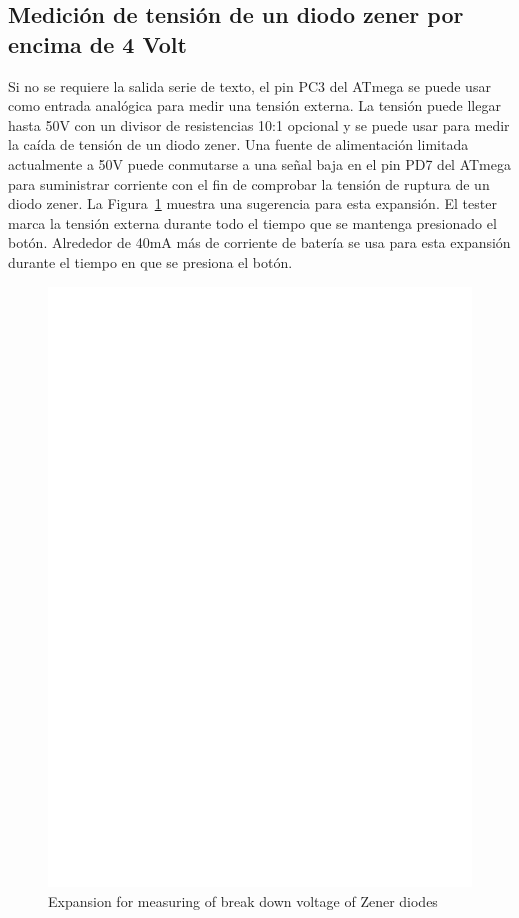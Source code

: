 \subsection{Medición de tensión de un diodo zener por encima de 4 Volt}

Si no se requiere la salida  serie de texto, el pin PC3 del ATmega se puede usar  como entrada analógica para medir una
tensión externa. La tensión puede  llegar hasta 50V con un divisor de resistencias 10:1 opcional  y se puede usar para
medir la caída de tensión de un diodo zener. Una fuente de alimentación limitada actualmente a 50V puede conmutarse a
una señal baja en el pin PD7 del ATmega para suministrar corriente con el fin de comprobar la tensión de ruptura de un
diodo zener. La Figura~\ref{fig:zener} muestra una sugerencia para  esta expansión. El tester marca la tensión externa
durante todo el tiempo que se mantenga presionado el botón. Alrededor de 40mA más de corriente de batería se usa para
esta expansión durante el tiempo en que se presiona el botón.

\begin{figure}[H]
\centering
\includegraphics[width=12cm]{../FIG/zener_exp.eps}
\caption{Expansion for measuring of break down voltage of Zener diodes}
\label{fig:zener}
\end{figure}

